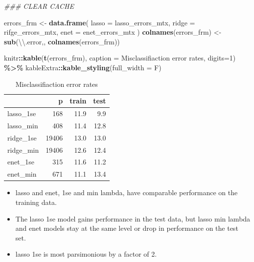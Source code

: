 \documentclass[
]{book}
\newenvironment{Shaded}{\begin{snugshade}}{\end{snugshade}}
\newcommand{\CharTok}[1]{\textcolor[rgb]{0.31,0.60,0.02}{#1}}
\newcommand{\CommentTok}[1]{\textcolor[rgb]{0.56,0.35,0.01}{\textit{#1}}}
\newcommand{\DataTypeTok}[1]{\textcolor[rgb]{0.13,0.29,0.53}{#1}}
\newcommand{\DecValTok}[1]{\textcolor[rgb]{0.00,0.00,0.81}{#1}}
\newcommand{\KeywordTok}[1]{\textcolor[rgb]{0.13,0.29,0.53}{\textbf{#1}}}
\newcommand{\NormalTok}[1]{#1}
\newcommand{\OperatorTok}[1]{\textcolor[rgb]{0.81,0.36,0.00}{\textbf{#1}}}
\newcommand{\StringTok}[1]{\textcolor[rgb]{0.31,0.60,0.02}{#1}}
\begin{document}
\begin{Shaded}
\begin{Highlighting}[]
\CommentTok{\#\#\# CLEAR CACHE}


\NormalTok{errors\_frm <{-}}\StringTok{ }\KeywordTok{data.frame}\NormalTok{(}
  \DataTypeTok{lasso =}\NormalTok{ lasso\_errors\_mtx, }\DataTypeTok{ridge =}\NormalTok{ rifge\_errors\_mtx, }\DataTypeTok{enet =}\NormalTok{ enet\_errors\_mtx}
\NormalTok{)}
\KeywordTok{colnames}\NormalTok{(errors\_frm) <{-}}\StringTok{ }\KeywordTok{sub}\NormalTok{(}\StringTok{\textquotesingle{}}\CharTok{\textbackslash{}\textbackslash{}}\StringTok{.error\textquotesingle{}}\NormalTok{,}\StringTok{\textquotesingle{}\textquotesingle{}}\NormalTok{, }\KeywordTok{colnames}\NormalTok{(errors\_frm))}

\NormalTok{knitr}\OperatorTok{::}\KeywordTok{kable}\NormalTok{(}\KeywordTok{t}\NormalTok{(errors\_frm),}
 \DataTypeTok{caption =} \StringTok{\textquotesingle{}Misclassifiaction error rates\textquotesingle{}}\NormalTok{,}
 \DataTypeTok{digits=}\DecValTok{1}\NormalTok{) }\OperatorTok{\%>\%}\StringTok{ }
\StringTok{  }\NormalTok{kableExtra}\OperatorTok{::}\KeywordTok{kable\_styling}\NormalTok{(}\DataTypeTok{full\_width =}\NormalTok{ F)}
\end{Highlighting}
\end{Shaded}

\begin{table}

\caption{\label{tab:brcaRna-glmnetFit-printErrors}Misclassifiaction error rates}
\centering
\begin{tabular}[t]{l|r|r|r}
\hline
  & p & train & test\\
\hline
lasso\_1se & 168 & 11.9 & 9.9\\
\hline
lasso\_min & 408 & 11.4 & 12.8\\
\hline
ridge\_1se & 19406 & 13.0 & 13.0\\
\hline
ridge\_min & 19406 & 12.6 & 12.4\\
\hline
enet\_1se & 315 & 11.6 & 11.2\\
\hline
enet\_min & 671 & 11.1 & 13.4\\
\hline
\end{tabular}
\end{table}

\begin{itemize}
\item
  lasso and enet, 1se and min lambda, have comparable performance
  on the training data.
\item
  The lasso 1se model gains performance in the test data, but
  lasso min lambda and enet models stay at the same level or drop
  in performance on the test set.
\item
  lasso 1se is most parsimonious by a factor of 2.
\end{itemize}
\end{document}
